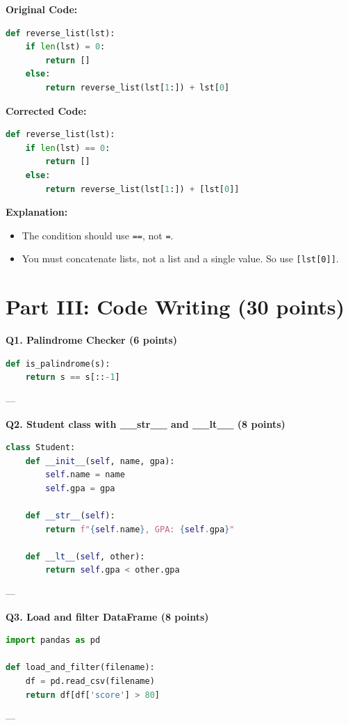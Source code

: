 \documentclass[12pt]{article}
\begin{document}
\textbf{Original Code:}
\begin{lstlisting}[language=Python]
def reverse_list(lst):
    if len(lst) = 0:
        return []
    else:
        return reverse_list(lst[1:]) + lst[0]
\end{lstlisting}

\textbf{Corrected Code:}
\begin{lstlisting}[language=Python]
def reverse_list(lst):
    if len(lst) == 0:
        return []
    else:
        return reverse_list(lst[1:]) + [lst[0]]
\end{lstlisting}

\textbf{Explanation:}
\begin{itemize}
\item The condition should use \texttt{==}, not \texttt{=}.
\item You must concatenate lists, not a list and a single value. So use \texttt{[lst[0]]}.
\end{itemize}

\newpage
\section*{Part III: Code Writing (30 points)}

\textbf{Q1. Palindrome Checker (6 points)}
\begin{lstlisting}[language=Python]
def is_palindrome(s):
    return s == s[::-1]
\end{lstlisting}

---

\textbf{Q2. Student class with \_\_str\_\_ and \_\_lt\_\_ (8 points)}
\begin{lstlisting}[language=Python]
class Student:
    def __init__(self, name, gpa):
        self.name = name
        self.gpa = gpa

    def __str__(self):
        return f"{self.name}, GPA: {self.gpa}"

    def __lt__(self, other):
        return self.gpa < other.gpa
\end{lstlisting}

---

\textbf{Q3. Load and filter DataFrame (8 points)}
\begin{lstlisting}[language=Python]
import pandas as pd

def load_and_filter(filename):
    df = pd.read_csv(filename)
    return df[df['score'] > 80]
\end{lstlisting}

---
\end{document}
